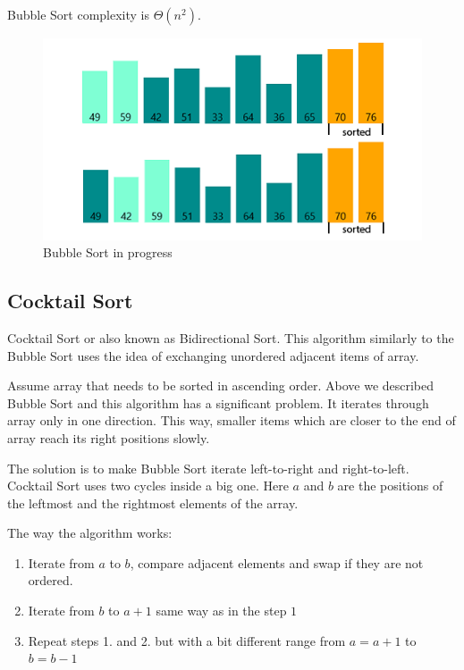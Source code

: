 \documentclass[
  field=inf,
  biblatex,
  language=english,
  glossaries,
  theorems=false,
  sourcecodes=false,
  index
]{kidiplom}
\begin{document}
Bubble Sort complexity is $\Theta(n^2)$.

\begin{figure}[H]
\begin{center}
	
	\includegraphics[scale=0.7]{img/Bubblesort.png}
	\caption{Bubble Sort in progress}\label{fig:bubble}
\end{center}
\end{figure}

\subsection{Cocktail Sort}

Cocktail Sort or also known as Bidirectional Sort. This algorithm similarly to the Bubble Sort uses the idea of exchanging unordered adjacent items of array. 

Assume array that needs to be sorted in ascending order. Above we described Bubble Sort and this algorithm has a significant problem. It iterates through array only in one direction. This way, smaller items which are closer to the end of array reach its right positions slowly.

The solution is to make Bubble Sort iterate left-to-right and right-to-left. Cocktail Sort uses two cycles inside a big one. Here $a$ and $b$ are the positions of the leftmost and the rightmost elements of the array.

The way the algorithm works:

\begin{enumerate}
 \item Iterate from $a$ to $b$, compare adjacent elements and swap if they are not ordered.
 \item Iterate from $b$ to $a + 1$ same way as in the step $1$
 \item Repeat steps 1. and 2. but with a bit different range from $a = a + 1$ to $b = b - 1$
\end{enumerate}
\end{document}
